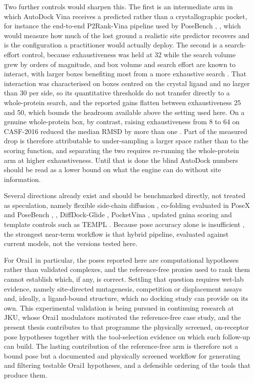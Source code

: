 Two further controls would sharpen this. The first is an intermediate arm in which AutoDock Vina receives a predicted rather than a crystallographic pocket, for instance the end-to-end P2Rank-Vina pipeline used by PoseBench \cite{ref069}, \cite{ref061}, which would measure how much of the lost ground a realistic site predictor recovers and is the configuration a practitioner would actually deploy. The second is a search-effort control, because exhaustiveness was held at 32 while the search volume grew by orders of magnitude, and box volume and search effort are known to interact, with larger boxes benefiting most from a more exhaustive search \cite{ref081}. That interaction was characterised on boxes centred on the crystal ligand and no larger than 30 \angstrom{} per side, so its quantitative thresholds do not transfer directly to a whole-protein search, and the reported gains flatten between exhaustiveness 25 and 50, which bounds the headroom available above the setting used here. On a genuine whole-protein box, by contrast, raising exhaustiveness from 8 to 64 on CASF-2016 reduced the median RMSD by more than one \angstrom{} \cite{ref082}. Part of the measured drop is therefore attributable to under-sampling a larger space rather than to the scoring function, and separating the two requires re-running the whole-protein arm at higher exhaustiveness. Until that is done the blind AutoDock numbers should be read as a lower bound on what the engine can do without site information.

Several directions already exist and should be benchmarked directly, not treated as speculation, namely flexible side-chain diffusion \cite{ref031}, co-folding evaluated in PoseX and PoseBench \cite{ref012}, \cite{ref069}, DiffDock-Glide \cite{ref064}, PocketVina \cite{ref066}, updated gnina scoring \cite{ref067} and template controls such as TEMPL \cite{ref065}. Because pose accuracy alone is insufficient \cite{ref032}, the strongest near-term workflow is that hybrid pipeline, evaluated against current models, not the versions tested here.

For Orai1 in particular, the poses reported here are computational hypotheses rather than validated complexes, and the reference-free proxies used to rank them cannot establish which, if any, is correct. Settling that question requires wet-lab evidence, namely site-directed mutagenesis, competition or displacement assays and, ideally, a ligand-bound structure, which no docking study can provide on its own. This experimental validation is being pursued in continuing research at JKU, whose Orai1 modulators motivated the reference-free case study, and the present thesis contributes to that programme the physically screened, on-receptor pose hypotheses together with the tool-selection evidence on which such follow-up can build. The lasting contribution of the reference-free arm is therefore not a bound pose but a documented and physically screened workflow for generating and filtering testable Orai1 hypotheses, and a defensible ordering of the tools that produce them.
